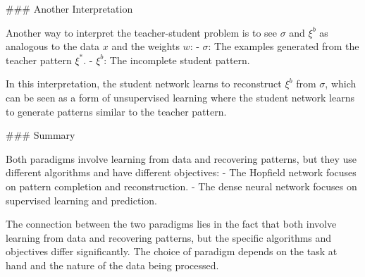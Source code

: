 ### Another Interpretation

Another way to interpret the teacher-student problem is to see \( \sigma \) and \( \xi^b \) as analogous to the data \( x \) and the weights \( w \):
- \( \sigma \): The examples generated from the teacher pattern \( \xi^* \).
- \( \xi^b \): The incomplete student pattern.

In this interpretation, the student network learns to reconstruct \( \xi^b \) from \( \sigma \), which can be seen as a form of unsupervised learning where the student network learns to generate patterns similar to the teacher pattern.

### Summary

Both paradigms involve learning from data and recovering patterns, but they use different algorithms and have different objectives:
- The Hopfield network focuses on pattern completion and reconstruction.
- The dense neural network focuses on supervised learning and prediction.

The connection between the two paradigms lies in the fact that both involve learning from data and recovering patterns, but the specific algorithms and objectives differ significantly. The choice of paradigm depends on the task at hand and the nature of the data being processed.